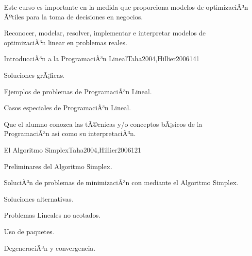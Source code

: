 \begin{syllabus}


\begin{justification}
Este curso es importante en la medida que proporciona modelos de optimizaciÃ³n Ãºtiles para la toma de decisiones en negocios.
\end{justification}

\begin{goals}
\item Reconocer, modelar, resolver, implementar e interpretar modelos de optimizaciÃ³n linear en problemas reales.
\end{goals}

\begin{outcomes}
\end{outcomes}

\begin{unit}{IntroducciÃ³n a la ProgramaciÃ³n Lineal}{Taha2004,Hillier2006}{14}{1}
   \begin{topics}
      \item Soluciones grÃ¡ficas.
      \item Ejemplos de problemas de ProgramaciÃ³n Lineal.
      \item Casos especiales de ProgramaciÃ³n Lineal.
   \end{topics}

   \begin{unitgoals}
      \item Que el alumno conozca las tÃ©cnicas y/o conceptos bÃ¡sicos de la ProgramaciÃ³n asi como su interpretaciÃ³n.
   \end{unitgoals}
\end{unit}

\begin{unit}{El Algoritmo Simplex}{Taha2004,Hillier2006}{12}{1}
   \begin{topics}
      \item Preliminares del Algoritmo Simplex.
      \item SoluciÃ³n de problemas de minimizaciÃ³n con mediante el Algoritmo Simplex.
      \item Soluciones alternativas.
      \item Problemas Lineales no acotados.
      \item Uso de paquetes.
      \item DegeneraciÃ³n y convergencia.
   \end{topics}


\end{unit}
\end{syllabus}
